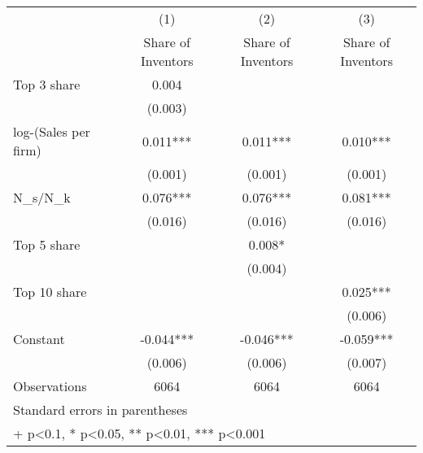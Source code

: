 {
\def\sym#1{\ifmmode^{#1}\else\(^{#1}\)\fi}
\begin{tabular}{l*{3}{c}}
\hline\hline
                    &\multicolumn{1}{c}{(1)}&\multicolumn{1}{c}{(2)}&\multicolumn{1}{c}{(3)}\\
                    &\multicolumn{1}{c}{Share of Inventors}&\multicolumn{1}{c}{Share of Inventors}&\multicolumn{1}{c}{Share of Inventors}\\
\hline
Top 3 share         &       0.004   &               &               \\
                    &     (0.003)   &               &               \\
[1em]
log-(Sales per firm)&       0.011***&       0.011***&       0.010***\\
                    &     (0.001)   &     (0.001)   &     (0.001)   \\
[1em]
N\_s/N\_k             &       0.076***&       0.076***&       0.081***\\
                    &     (0.016)   &     (0.016)   &     (0.016)   \\
[1em]
Top 5 share         &               &       0.008*  &               \\
                    &               &     (0.004)   &               \\
[1em]
Top 10 share        &               &               &       0.025***\\
                    &               &               &     (0.006)   \\
[1em]
Constant            &      -0.044***&      -0.046***&      -0.059***\\
                    &     (0.006)   &     (0.006)   &     (0.007)   \\
\hline
Observations        &        6064   &        6064   &        6064   \\
\hline\hline
\multicolumn{4}{l}{\footnotesize Standard errors in parentheses}\\
\multicolumn{4}{l}{\footnotesize + p<0.1, * p<0.05, ** p<0.01, *** p<0.001}\\
\end{tabular}
}
